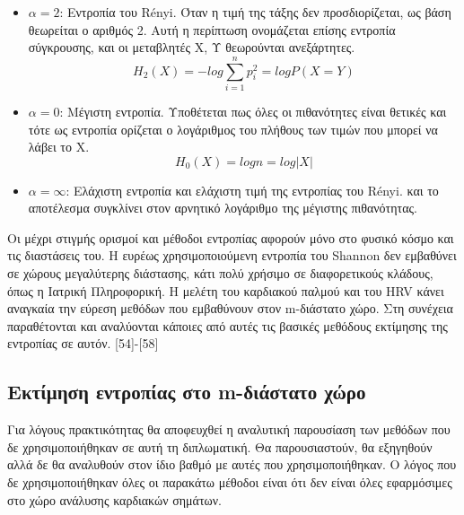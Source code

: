 \begin{itemize}
\begin{itemize}
		\item $\alpha = 2$: Εντροπία του \en Rényi. \gr Όταν η τιμή της τάξης δεν προσδιορίζεται, ως βάση θεωρείται ο αριθμός 2. Αυτή η περίπτωση ονομάζεται επίσης εντροπία σύγκρουσης, και οι μεταβλητές Χ, Υ θεωρούνται ανεξάρτητες.
		\begin{equation}
			H_2 (X) = - log\sum_{i=1}^{n}{p_i^2} = log P(X = Y)
		\end{equation}
		
		\item $\alpha = 0$: Μέγιστη εντροπία. Υποθέτεται πως όλες οι πιθανότητες είναι θετικές και τότε ως εντροπία ορίζεται ο λογάριθμος του πλήθους των τιμών που μπορεί να λάβει το Χ.
		\begin{equation}
			H_0 (X) = log n = log |X|
		\end{equation}
		
		\item $\alpha = \infty$: Ελάχιστη εντροπία και ελάχιστη τιμή της εντροπίας του \en Rényi. \gr και το αποτέλεσμα συγκλίνει στον αρνητικό λογάριθμο της μέγιστης πιθανότητας.
	\end{itemize}
	
	Οι μέχρι στιγμής ορισμοί και μέθοδοι εντροπίας αφορούν μόνο στο φυσικό κόσμο και τις διαστάσεις του. Η ευρέως χρησιμοποιούμενη εντροπία του \en  Shannon \gr δεν εμβαθύνει σε χώρους μεγαλύτερης διάστασης, κάτι πολύ χρήσιμο σε διαφορετικούς κλάδους, όπως η Ιατρική Πληροφορική. Η μελέτη  του καρδιακού παλμού και του \en HRV \gr κάνει αναγκαία την εύρεση μεθόδων που εμβαθύνουν στον \en m\gr-διάστατο χώρο. Στη συνέχεια παραθέτονται και αναλύονται κάποιες από αυτές τις βασικές μεθόδους εκτίμησης της εντροπίας σε αυτόν. [54]-[58]
\end{itemize}
\subsection{Εκτίμηση εντροπίας στο \en m-\gr διάστατο χώρο}
Για λόγους πρακτικότητας θα αποφευχθεί η αναλυτική παρουσίαση των μεθόδων που δε χρησιμοποιήθηκαν σε αυτή τη διπλωματική. Θα παρουσιαστούν, θα εξηγηθούν αλλά δε θα αναλυθούν στον ίδιο βαθμό με αυτές που χρησιμοποιήθηκαν. Ο λόγος που δε χρησιμοποιήθηκαν όλες οι παρακάτω μέθοδοι είναι ότι δεν είναι όλες εφαρμόσιμες στο χώρο ανάλυσης καρδιακών σημάτων. 
